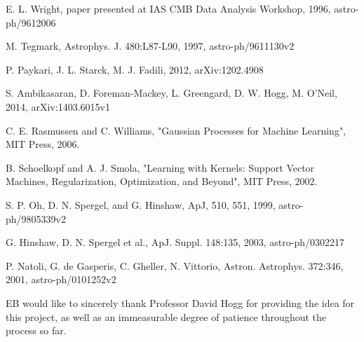 \documentclass[12pt]{article}
\begin{document}
\begin{thebibliography}{99}



E. L. Wright, paper presented at IAS CMB Data Analysis Workshop, 1996, astro-ph/9612006


M. Tegmark, Astrophys. J. 480:L87-L90, 1997, astro-ph/9611130v2 

P. Paykari, J. L. Starck, M. J. Fadili, 2012, arXiv:1202.4908

S. Ambikasaran, D. Foreman-Mackey, L. Greengard, D. W. Hogg, M. O'Neil, 2014, arXiv:1403.6015v1


C. E. Rasmussen and C. Williams, "Gaussian Processes for Machine Learning", MIT Press, 2006. 

B. Schoelkopf and A. J. Smola, "Learning with Kernels: Support Vector Machines, Regularization, Optimization, and Beyond", MIT Press, 2002. 


S. P. Oh, D. N. Spergel, and G. Hinshaw, ApJ, 510, 551, 1999, astro-ph/9805339v2 

G. Hinshaw, D. N. Spergel et al., ApJ. Suppl. 148:135, 2003, astro-ph/0302217




P. Natoli, G. de Gasperis, C. Gheller, N. Vittorio, Astron. Astrophys. 372:346, 2001, astro-ph/0101252v2 







\end{thebibliography}

\begin{itshape} 
EB would like to sincerely thank Professor David Hogg for providing the idea for this project, as well as an immeasurable degree of patience throughout the process so far.
\end{itshape}
\end{document}
